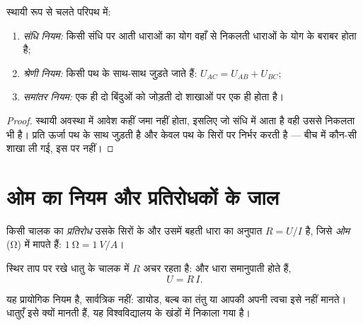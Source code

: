 \begin{proposition}[परिपथ के नियम]\label{prop:g11:circuits-and-power:laws}
स्थायी रूप से चलते परिपथ में:
\begin{enumerate}
  \item \emph{संधि नियम:} किसी संधि पर आती धाराओं का योग वहाँ से निकलती
        धाराओं के योग के बराबर होता है;
  \item \emph{श्रेणी नियम:} किसी पथ के साथ-साथ  जुड़ते जाते
        हैं: $U_{AC} = U_{AB} + U_{BC}$;
  \item \emph{समांतर नियम:} एक ही दो बिंदुओं को जोड़ती दो शाखाओं पर एक ही
         होता है।
\end{enumerate}
\end{proposition}

\begin{proof}
स्थायी अवस्था में आवेश कहीं जमा नहीं होता, इसलिए जो संधि में आता है वही उससे
निकलता भी है। प्रति  ऊर्जा पथ के साथ जुड़ती है और केवल
पथ के सिरों पर निर्भर करती है --- बीच में कौन-सी शाखा ली गई, इस पर नहीं।
\end{proof}

\section{ओम का नियम और प्रतिरोधकों के जाल}

\begin{definition}[प्रतिरोध]\label{def:g11:circuits-and-power:resistance}
किसी चालक का \emph{प्रतिरोध} उसके सिरों के 
और उसमें बहती धारा का अनुपात $R = U/I$ है, जिसे \emph{ओम} (\unit{\ohm}) में
मापते हैं: $\qty{1}{\ohm} = \qty{1}{V/A}$।
\end{definition}

\begin{proposition}[ओम का नियम]\label{prop:g11:circuits-and-power:ohm}
स्थिर ताप पर रखे धातु के चालक में $R$ अचर रहता है:  और
धारा समानुपाती होते हैं,
\[ U = R\,I . \]
\end{proposition}
\admitted

\begin{remark}\label{rem:g11:circuits-and-power:ohm-limits}
यह प्रायोगिक नियम है, सार्वत्रिक नहीं: डायोड, बल्ब का तंतु या आपकी अपनी
त्वचा इसे नहीं मानते। धातुएँ इसे क्यों मानती हैं, यह विश्वविद्यालय के खंडों
में निकाला गया है।
\end{remark}

